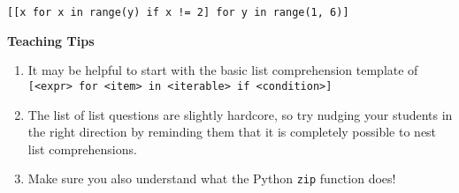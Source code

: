 \begin{blocksection}
\begin{parts}
\begin{solution}[0.25in]
\begin{lstlisting}
[[x for x in range(y) if x != 2] for y in range(1, 6)] 
\end{lstlisting}
\end{solution}
\end{parts}
\begin{blocksection}
    \begin{guide}
    \textbf{Teaching Tips}
    \begin{enumerate}
            \item It may be helpful to start with the basic list comprehension template of \texttt{[<expr> for <item> in <iterable> if <condition>]}
            \item The list of list questions are slightly hardcore, so try nudging your students in the right direction by reminding them that it is completely possible to nest list comprehensions.
            \item Make sure you also understand what the Python \texttt{zip} function does! 
    \end{enumerate}
    \end{guide}
\end{blocksection}
\end{blocksection}